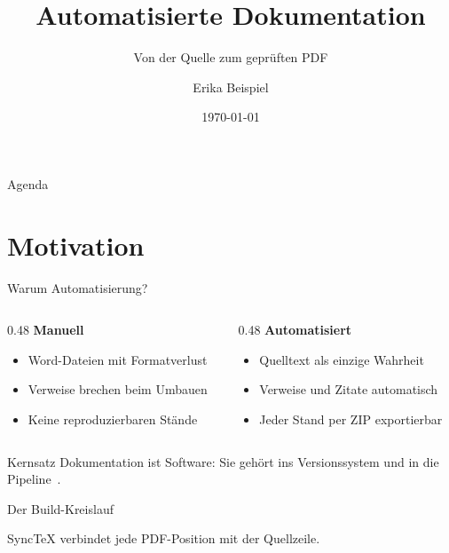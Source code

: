 \documentclass[aspectratio=169,11pt]{beamer}
\title{Automatisierte Dokumentation}
\subtitle{Von der Quelle zum geprüften PDF}
\author{Erika Beispiel}
\institute{Beispiel-Institut für Technische Kommunikation}
\date{\today}
\begin{document}
\maketitle

\begin{frame}{Agenda}
  \tableofcontents
\end{frame}

\section{Motivation}

\begin{frame}{Warum Automatisierung?}
  \begin{columns}[T]
    \begin{column}{0.48\textwidth}
      \textbf{Manuell}
      \begin{itemize}
        \item Word-Dateien mit Formatverlust
        \item Verweise brechen beim Umbauen
        \item Keine reproduzierbaren Stände
      \end{itemize}
    \end{column}
    \begin{column}{0.48\textwidth}
      \textbf{Automatisiert}
      \begin{itemize}
        \item Quelltext als einzige Wahrheit
        \item Verweise und Zitate automatisch
        \item Jeder Stand per ZIP exportierbar
      \end{itemize}
    \end{column}
  \end{columns}

  \vspace{1em}
  \begin{alertblock}{Kernsatz}
    Dokumentation ist Software: Sie gehört ins Versions­system und in die
    Pipeline~\cite{knuth1984}.
  \end{alertblock}
\end{frame}

\begin{frame}{Der Build-Kreislauf}
  \centering

  \vspace{1em}
  \footnotesize SyncTeX verbindet jede PDF-Position mit der Quellzeile.
\end{frame}
\end{document}
